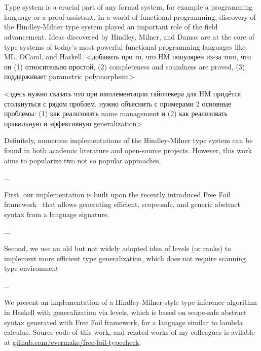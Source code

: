 \chapter{}
\label{chap:intro}


Type system is a crucial part of any formal system, for example a programming language or a proof assistant. In a world of functional programming, discovery of the Hindley-Milner type system played an important role of the field advancement. Ideas discovered by Hindley, Milner, and Damas are at the core of type systems of today's most powerful functional programming languages like ML, OCaml, and Haskell. <добавить про то, что HM популярен из-за того, что он (1) относительно простой, (2) completeness and soundness are proved, (3) поддерживает parametric polymorphsim>

<здесь нужно сказать что при имплементации тайпчекера для HM придётся столкнуться с рядом проблем. нужно объяснить с примерами 2 основные проблемы: (1) как реализовать name management и (2) как реализовать правильную и эффективную generalization>

Definitely, numerous implementations of the Hindley-Milner type system can be found in both academic literature and open-source projects. However, this work aims to popularize two not so popular approaches.

...

First, our implementation is built upon the recently introduced Free Foil framework~\cite{FreeFoil} that allows generating efficient, scope-safe, and generic abstract syntax from a language signature.

...

Second, we use an old but not widely adopted idea of levels (or ranks) to implement more efficient type generalization, which does not require scanning type environment

...

We present an implementation of a Hindley-Milner-style type inference algorithm in Haskell with generalization via levels, which is based on scope-safe abstract syntax generated with Free Foil framework, for a language similar to lambda calculus. Source code of this work, and related works of my colleagues is avilable at \href{https://github.com/evermake/free-foil-typecheck}{github.com/evermake/free-foil-typecheck}.
